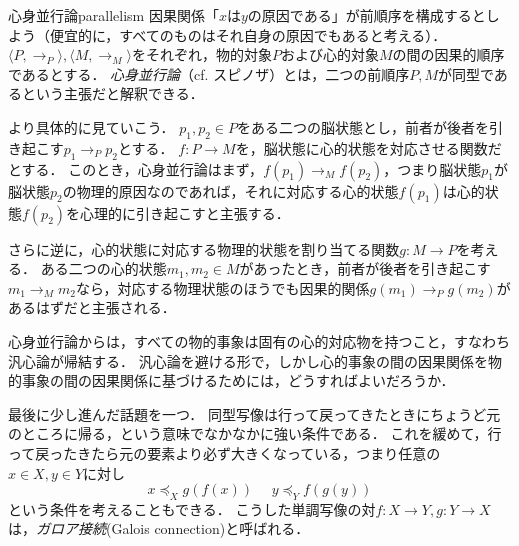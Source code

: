 \documentclass[dvipdfmx,11pt,a4paper]{jsarticle}
\begin{document}
\begin{rei}{心身並行論}{parallelism}
因果関係「$x$は$y$の原因である」が前順序を構成するとしよう（便宜的に，すべてのものはそれ自身の原因でもあると考える）．
$\langle P, \to_P \rangle, \langle M, \to_M \rangle$をそれぞれ，物的対象$P$および心的対象$M$の間の因果的順序であるとする．
\emph{心身並行論}（cf. スピノザ）とは，二つの前順序$P, M$が同型であるという主張だと解釈できる．

より具体的に見ていこう．
$p_1, p_2 \in P$をある二つの脳状態とし，前者が後者を引き起こす$p_1 \to_P p_2$とする．
$f: P \to M$を，脳状態に心的状態を対応させる関数だとする．
このとき，心身並行論はまず，$f(p_1) \to_M f(p_2)$，つまり脳状態$p_1$が脳状態$p_2$の物理的原因なのであれば，それに対応する心的状態$f(p_1)$は心的状態$f(p_2)$を心理的に引き起こすと主張する．

さらに逆に，心的状態に対応する物理的状態を割り当てる関数$g: M \to P$を考える．
ある二つの心的状態$m_1, m_2 \in M$があったとき，前者が後者を引き起こす$m_1 \to_M m_2$なら，対応する物理状態のほうでも因果的関係$g(m_1) \to_P g(m_2)$があるはずだと主張される．
\end{rei}

\begin{hatten}{}{}
心身並行論からは，すべての物的事象は固有の心的対応物を持つこと，すなわち汎心論が帰結する．
汎心論を避ける形で，しかし心的事象の間の因果関係を物的事象の間の因果関係に基づけるためには，どうすればよいだろうか．
\end{hatten}

最後に少し進んだ話題を一つ．
同型写像は行って戻ってきたときにちょうど元のところに帰る，という意味でなかなかに強い条件である．
これを緩めて，行って戻ったきたら元の要素より必ず大きくなっている，つまり任意の$x \in X, y \in Y$に対し
\[
 x \preceq_X g(f(x)) \ \ \ \ \ \ y \preceq_Y f(g(y))
\]
という条件を考えることもできる．
こうした単調写像の対$f:X \to Y, g:Y \to X$は，\emph{ガロア接続}(Galois connection)と呼ばれる．



\end{document}
